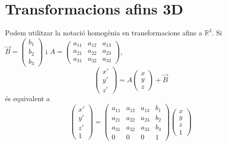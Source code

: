 \documentclass{beamer}
\begin{document}
\section{Transformacions afins 3D}
\begin{frame}
  Podem utilitzar la notació homogènia en transformacions afins a $\mathbb{R}^3$. Si $\overrightarrow{B}= \begin{pmatrix}b_1\\b_2\\b_3\end{pmatrix}$ i $A=\begin{pmatrix}a_{11}&a_{12}&a_{13}\\a_{21}&a_{22}&a_{23}\\a_{31}&a_{32}&a_{33}\end{pmatrix}$,
  \[
    \begin{pmatrix}x'\\y'\\z'\end{pmatrix} =A \begin{pmatrix}x\\y\\z\end{pmatrix} + \overrightarrow{B}
  \]
  és equivalent a
  \[
    \begin{pmatrix}x'\\y'\\z'\\1\end{pmatrix} = \begin{pmatrix}a_{11}&a_{12}&a_{13}&b_1\\a_{21}&a_{22}&a_{23}&b_2\\a_{31}&a_{32}&a_{33}&b_3\\0&0&0&1\end{pmatrix} \begin{pmatrix}x\\y\\z\\1\end{pmatrix}
  \]
\end{frame}
\end{document}
